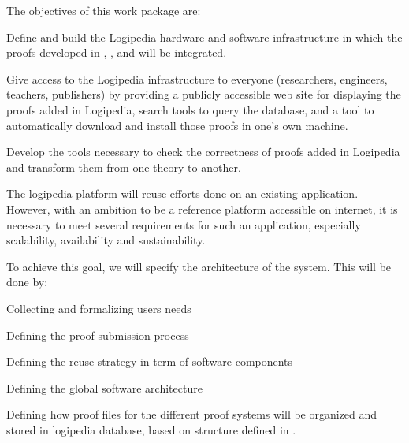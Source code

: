 \begin{workpackage}[id=access,type=RTD,
  short=Access,%
  title={Access},
  lead=Irt,IrtRM=23,OcaRM=6,EduRM=12,InrRM=18]

\begin{wpobjectives}
  The objectives of this work package are:
  \begin{compactenum}[(a)]
  \item Define and build the Logipedia hardware and software
    infrastructure in which the proofs developed in
    ,
    ,
    and  will be
    integrated.
  \item Give access to the Logipedia infrastructure to everyone
    (researchers, engineers, teachers, publishers) by providing a
    publicly accessible web site for displaying the proofs added in
    Logipedia, search tools to query the database, and a tool to
    automatically download and install those proofs in one's own
    machine.
  \item Develop the tools necessary to check the correctness of proofs
    added in Logipedia and transform them from one theory to another.
  \end{compactenum}
\end{wpobjectives}

\begin{tasklist}

  \begin{task}[id=archi,
      title=Defining the functional and software architecture,
      lead=Irt,IrtRM=3]
    The logipedia platform will reuse efforts done on an existing
    application. However, with an ambition to be a reference platform
    accessible on internet, it is necessary to meet several
    requirements for such an application, especially scalability,
    availability and sustainability.

    To achieve this goal, we will specify the architecture of the system.
    This will be done by:
    \begin{compactitem}
    \item Collecting and formalizing users needs
    \item Defining the proof submission process
    \item Defining the reuse strategy in term of software components
    \item Defining the global software architecture
    \item Defining how proof files for the different proof systems
      will be organized and stored in logipedia database, based on
      structure defined in .
    \end{compactitem}


\end{task}
\end{tasklist}
\end{workpackage}
